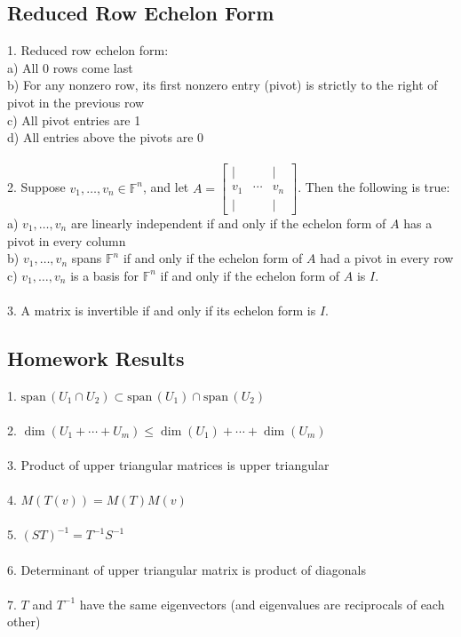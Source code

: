 \documentclass[11pt,reqno]{article}
\newcommand{\spn}{\mathrm{span\,}}
\newcommand{\F}{\mathbb{F}}
\theoremstyle{definition}
\begin{document}
\subsection*{Reduced Row Echelon Form}
1. Reduced row echelon form:\\
\indent a) All $0$ rows come last\\
\indent b) For any nonzero row, its first nonzero entry (pivot) is strictly to the right of pivot in the previous row\\
\indent c) All pivot entries are 1\\
\indent d) All entries above the pivots are $0$\\\\
2. Suppose $v_1,\ldots,v_n\in\F^n$, and let $A=
\begin{bmatrix}
    | & & |\\
    v_1 & \cdots & v_n\\
    | & & |
\end{bmatrix}$. Then the following is true:\\
\indent a) $v_1,\ldots,v_n$ are linearly independent if and only if the echelon form of $A$ has a pivot in every column\\
\indent b) $v_1,\ldots,v_n$ spans $\F^n$ if and only if the echelon form of $A$ had a pivot in every row\\
\indent c) $v_1,\ldots,v_n$ is a basis for $\F^n$ if and only if the echelon form of $A$ is $I$.\\\\
3. A matrix is invertible if and only if its echelon form is $I$.

\subsection*{Homework Results}
1. $\spn(U_1 \cap U_2) \subset \spn(U_1) \cap \spn(U_2)$\\\\
2. $\dim(U_1 + \cdots + U_m) \leq \dim(U_1) + \cdots + \dim(U_m)$\\\\
3. Product of upper triangular matrices is upper triangular\\\\
4. $M(T(v)) = M(T)M(v)$\\\\
5. $(ST)^{-1} = T^{-1}S^{-1}$\\\\
6. Determinant of upper triangular matrix is product of diagonals\\\\
7. $T$ and $T^{-1}$ have the same eigenvectors (and eigenvalues are reciprocals of each other)
\end{document}
